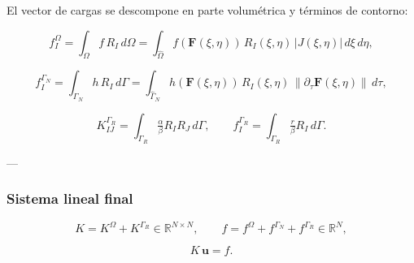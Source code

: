 \documentclass[12pt]{article}
\begin{document}
El vector de cargas se descompone en parte volumétrica y términos de contorno:

\[
f_I^\Omega = \int_\Omega f \, R_I \, d\Omega 
= \int_{\hat\Omega} f(\mathbf F(\xi,\eta)) \, R_I(\xi,\eta) \, 
  |J(\xi,\eta)| \, d\xi\, d\eta,
\]

\[
f_I^{\Gamma_N} = \int_{\Gamma_N} h \, R_I \, d\Gamma
= \int_{\hat\Gamma_N} h(\mathbf F(\xi,\eta)) \, R_I(\xi,\eta) \, 
  \|\partial_\tau \mathbf F(\xi,\eta)\| \, d\tau,
\]

\[
K_{IJ}^{\Gamma_R} = \int_{\Gamma_R} \tfrac{\alpha}{\beta} R_I R_J \, d\Gamma,
\qquad
f_I^{\Gamma_R} = \int_{\Gamma_R} \tfrac{r}{\beta} R_I \, d\Gamma.
\]

---

\subsubsection*{Sistema lineal final}

\[
K = K^\Omega + K^{\Gamma_R} \in \mathbb{R}^{N\times N}, 
\qquad
f = f^\Omega + f^{\Gamma_N} + f^{\Gamma_R} \in \mathbb{R}^N,
\]

\[
K \, \mathbf u = f.
\]
\end{document}
